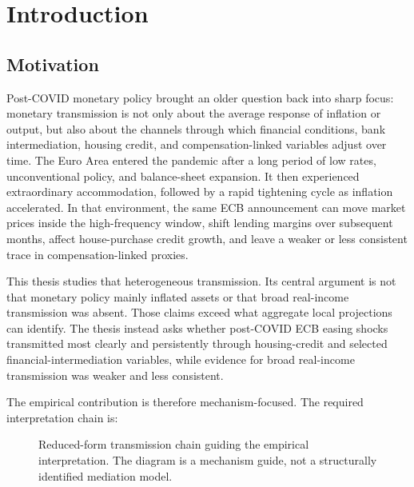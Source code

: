 \chapter{Introduction}
\label{chap:introduction}

\section{Motivation}

Post-COVID monetary policy brought an older question back into sharp focus: monetary transmission is not only about the average response of inflation or output, but also about the channels through which financial conditions, bank intermediation, housing credit, and compensation-linked variables adjust over time. The Euro Area entered the pandemic after a long period of low rates, unconventional policy, and balance-sheet expansion. It then experienced extraordinary accommodation, followed by a rapid tightening cycle as inflation accelerated. In that environment, the same ECB announcement can move market prices inside the high-frequency window, shift lending margins over subsequent months, affect house-purchase credit growth, and leave a weaker or less consistent trace in compensation-linked proxies.

This thesis studies that heterogeneous transmission. Its central argument is not that monetary policy mainly inflated assets or that broad real-income transmission was absent. Those claims exceed what aggregate local projections can identify. The thesis instead asks whether post-COVID ECB easing shocks transmitted most clearly and persistently through housing-credit and selected financial-intermediation variables, while evidence for broad real-income transmission was weaker and less consistent.

The empirical contribution is therefore mechanism-focused. The required interpretation chain is:

\begin{figure}[htbp]
  \centering
  \caption{Reduced-form transmission chain guiding the empirical interpretation. The diagram is a mechanism guide, not a structurally identified mediation model.}
  \label{fig:conceptual-intermediation-chain}
\end{figure}

